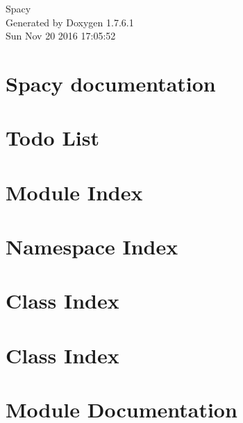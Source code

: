 \documentclass[a4paper]{book}
\begin{document}
\hypersetup{pageanchor=false,citecolor=blue}
\begin{titlepage}
\vspace*{7cm}
\begin{center}
{\Large \-Spacy }\\
\vspace*{1cm}
{\large \-Generated by Doxygen 1.7.6.1}\\
\vspace*{0.5cm}
{\small Sun Nov 20 2016 17:05:52}\\
\end{center}
\end{titlepage}
\clearemptydoublepage
{}
\tableofcontents
\clearemptydoublepage
{}
\hypersetup{pageanchor=true,citecolor=blue}
\chapter{\-Spacy documentation}
\label{index}\hypertarget{index}{}
\chapter{\-Todo \-List}
\label{todo}
\hypertarget{todo}{}

\chapter{\-Module \-Index}

\chapter{\-Namespace \-Index}

\chapter{\-Class \-Index}

\chapter{\-Class \-Index}

\chapter{\-Module \-Documentation}














\end{document}

